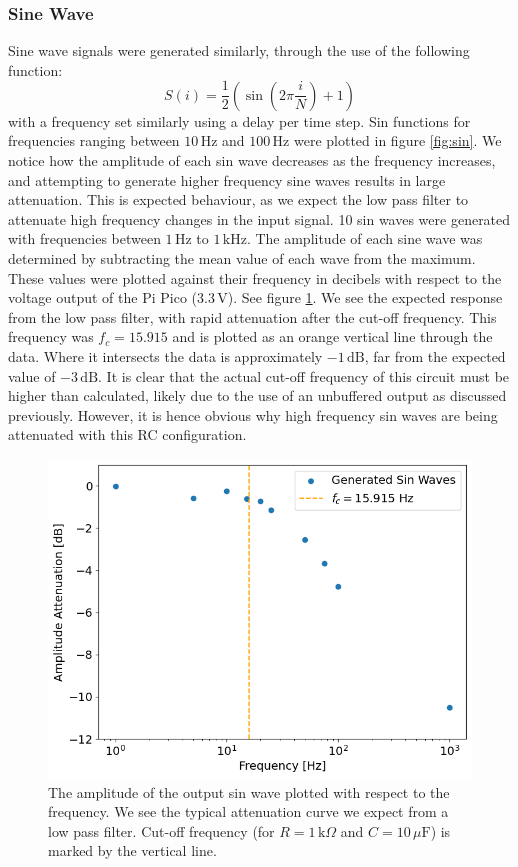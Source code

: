 \documentclass[%
 reprint,
 amsmath,amssymb,
 aps,
]{revtex4-2}
\begin{document}
        \subsubsection{Sine Wave}
        
        Sine wave signals were generated similarly, through the use of the following function:
        \begin{equation}
            S(i) = \frac{1}{2}\left(\sin\left(2\pi\frac{i}{N}\right) + 1\right)
        \end{equation}with a frequency set similarly using a delay per time step. Sin functions for frequencies ranging between $10\,\text{Hz}$ and $100\,\text{Hz}$ were plotted in figure \ref{fig:sin}. We notice how the amplitude of each sin wave decreases as the frequency increases, and attempting to generate higher frequency sine waves results in large attenuation. This is expected behaviour, as we expect the low pass filter to attenuate high frequency changes in the input signal. 10 sin waves were generated with frequencies between $1\,\text{Hz}$ to $1\,\text{kHz}$. The amplitude of each sine wave was determined by subtracting the mean value of each wave from the maximum. These values were plotted against their frequency in decibels with respect to the voltage output of the Pi Pico ($3.3\,\text{V}$). See figure \ref{fig:attenuation}. We see the expected response from the low pass filter, with rapid attenuation after the cut-off frequency. This frequency was $f_c = 15.915$ and is plotted as an orange vertical line through the data. Where it intersects the data is approximately $-1\,\text{dB}$, far from the expected value of $-3\,\text{dB}$. It is clear that the actual cut-off frequency of this circuit must be higher than calculated, likely due to the use of an unbuffered output as discussed previously. However, it is hence obvious why high frequency sin waves are being attenuated with this RC configuration.

        \begin{figure}
            \includegraphics[width=0.9\columnwidth]{Images/attenuation.png}
            \caption{\label{fig:attenuation}The amplitude of the output sin wave plotted with respect to the frequency. We see the typical attenuation curve we expect from a low pass filter. Cut-off frequency (for $R=1\,\text{k}\Omega$ and $C=10\,\mu\text{F}$) is marked by the vertical line.}
        \end{figure}
\end{document}
